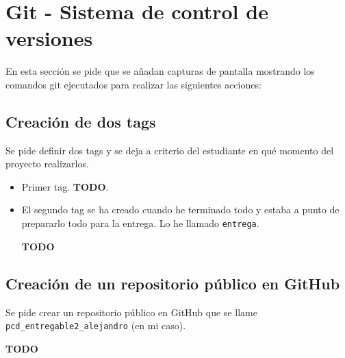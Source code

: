 \section{Git - Sistema de control de versiones}

En esta sección se pide que se añadan capturas de pantalla mostrando los comandos git ejecutados para realizar las siguientes acciones:

\subsection{Creación de dos tags}

Se pide definir dos tags y se deja a criterio del estudiante en qué momento del proyecto realizarlos.

\begin{itemize}
    \item Primer tag. \textbf{TODO}.

    \item El segundo tag se ha creado cuando he terminado todo y estaba a punto de prepararlo todo para la entrega. Lo he llamado \texttt{entrega}.

    \begin{center}
        \textbf{TODO}
    \end{center}
\end{itemize}


\subsection{Creación de un repositorio público en GitHub}

Se pide crear un repositorio público en GitHub que se llame \texttt{pcd\_entregable2\_alejandro} (en mi caso).

\begin{center}
    \textbf{TODO}
\end{center}
